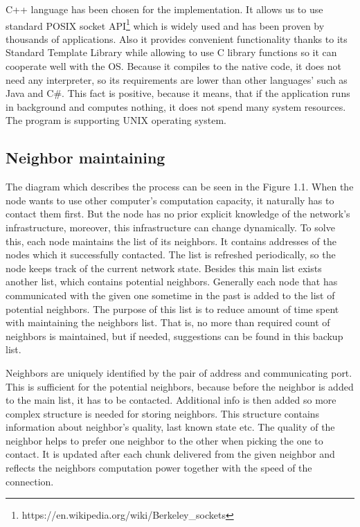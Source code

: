 C++ language has been chosen for the implementation. It allows us to use
standard POSIX socket
API\footnote{https://en.wikipedia.org/wiki/Berkeley\_sockets} which is
widely used and has been proven by thousands of applications. Also it
provides convenient functionality thanks to its Standard Template
Library while allowing to use C library functions so it can cooperate
well with the OS. Because it compiles to the native code, it does not
need any interpreter, so its requirements are lower than other
languages' such as Java and C\#. This fact is positive, because it
means, that if the application runs in background and computes nothing,
it does not spend many system resources. The program is supporting UNIX
operating system.

\subsection{Neighbor maintaining}\label{neighbor-maintaining}

The diagram which describes the process can be seen in the Figure 1.1.
When the node wants to use other computer's computation capacity, it
naturally has to contact them first. But the node has no prior explicit
knowledge of the network's infrastructure, moreover, this infrastructure
can change dynamically. To solve this, each node maintains the list of
its neighbors. It contains addresses of the nodes which it successfully
contacted. The list is refreshed periodically, so the node keeps track
of the current network state. Besides this main list exists another
list, which contains potential neighbors. Generally each node that has
communicated with the given one sometime in the past is added to the
list of potential neighbors. The purpose of this list is to reduce
amount of time spent with maintaining the neighbors list. That is, no
more than required count of neighbors is maintained, but if needed,
suggestions can be found in this backup list.

Neighbors are uniquely identified by the pair of address and
communicating port. This is sufficient for the potential neighbors,
because before the neighbor is added to the main list, it has to be
contacted. Additional info is then added so more complex structure is
needed for storing neighbors. This structure contains information about
neighbor's quality, last known state etc. The quality of the neighbor
helps to prefer one neighbor to the other when picking the one to
contact. It is updated after each chunk delivered from the given
neighbor and reflects the neighbors computation power together with the
speed of the connection.

